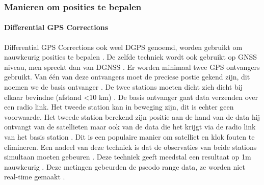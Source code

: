 \subsubsection{Manieren om posities te bepalen}
\paragraph{Differential GPS Corrections}
Differential GPS Corrections ook weel DGPS genoemd, worden gebruikt om nauwkeurig posities  te bepalen \cite{LBibGLONASS2}. De zelfde techniek wordt ook gebruikt op GNSS niveau, men spreekt dan van DGNSS \cite{LBibGNSS8}. Er worden minimaal twee GPS ontvangers gebruikt. Van \'e\'en van deze ontvangers moet de preciese postie gekend zijn, dit noemen we de basis ontvanger \cite{LBibGNSS2,LBibRTK}. De twee stations moeten dicht zich dicht bij elkaar bevindne (afstand <10 km) \cite{LBibDGPS}. De basis ontvanger gaat data verzenden over een radio link.  Het tweede station kan in beweging zijn, dit is echter geen voorwaarde. Het tweede station berekend zijn positie aan de hand van de data hij ontvangt van de satellieten maar ook van de data die het krijgt via de radio link van het basis station \cite{LBibRTK}. Dit is een populaire manier om satelliet en klok fouten te elimineren. Een nadeel van deze techniek is dat de observaties van beide stations simultaan moeten gebeuren \cite{LBibGNSS2}. Deze techniek geeft meedstal een resultaat op 1m nauwkeurig \cite{LBibRTK}. Deze metingen gebeurden de pseodo range data, ze worden niet real-time gemaakt \cite{LBibRTK3}.

